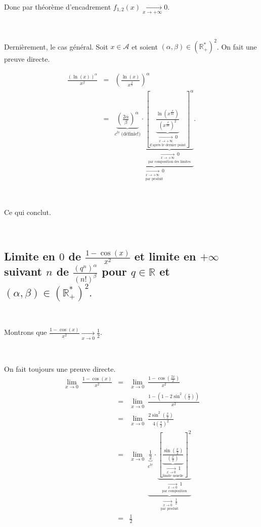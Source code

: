 \documentclass{article}
\begin{document}
\

Donc par théorème d'encadrement $f_{1,2}(x)\xrightarrow[x\to+\infty]{} 0$.

\

Dernièrement, le cas général. Soit $x\in \mathcal{A}$ et soient $(\alpha,\beta)\in \left( \mathbb{R}_+^* \right)^2$. On fait une preuve directe. 

\begin{eqnarray*}
    \frac{(\ln (x))^\alpha}{x^\beta} & = & \left( \frac{\ln (x)}{x^{\frac{\beta}{\alpha}}} \right)^\alpha \\[1.5ex]
    & = & \underset{\underset{\text{par produit}}{\xrightarrow[x\to+\infty]{} \ 0}}{\underbrace{\underset{c^{\underline{te}} \ \text{(définie!)}}{\underbrace{\left( \frac{2\alpha}{\beta} \right)^\alpha}} \cdot \underset{\underset{\text{par composition des limites}}{\xrightarrow[x\to+\infty]{} \ 0}}{\underbrace{\left[ \underset{\underset{\text{d'après le dernier point}}{\xrightarrow[x\to+\infty]{} \ 0}}{\underbrace{ \frac{\ln \left( x^{\frac{\beta}{2 \alpha}} \right) }{\left( x^{\frac{\beta}{2\alpha}} \right)^2} }}\right]^\alpha}}}}.
\end{eqnarray*}

\

Ce qui conclut.

\


\subsection{Limite en $0$ de $\frac{1-\cos (x)}{x^2}$ et limite en $+\infty$ suivant $n$ de $\frac{\left(q^n \right)^\alpha}{(n!)^\beta}$ pour $q\in \mathbb{R}$ et $(\alpha,\beta)\in \left( \mathbb{R}_+^* \right)^2.$} 

\

Montrons que $\frac{1-\cos (x)}{x^2} \xrightarrow[x\to 0]{} \frac{1}{2}$.

\

On fait toujours une preuve directe. 
\begin{eqnarray*}
    \lim_{x\to0} \ \frac{1-\cos (x)}{x^2} & = & \lim_{x\to0} \ \frac{1-\cos \left( \frac{2x}{2}\right) }{x^2} \\[1ex]
    & = & \lim_{x\to0} \ \frac{1-\left( 1-2\sin ^2 \left( \frac{x}{2}\right) \right) }{x^2} \\[1ex]
    & = &  \lim_{x\to0} \ \frac{2\sin ^2 \left( \frac{x}{2}\right) }{4 \left( \frac{x}{2}\right) ^2} \\[1ex]
    & = & \lim_{x\to0} \ \underset{\underset{\text{par produit}}{\xrightarrow[x\to 0]{} \ \frac{1}{2}}}{\underbrace{\underset{c^{\underline{te}}}{\underbrace{\frac{1}{2}}} \cdot \underset{\underset{\text{par composition}}{\xrightarrow[x\to 0]{} \ 1}}{\underbrace{\left[\underset{\underset{\text{limite usuelle}}{\xrightarrow[x\to 0]{} \ 1}}{\underbrace{\frac{\sin \left( \frac{x}{2}\right) }{\left( \frac{x}{2}\right)} }} \right] ^2}}}} \\[1ex]
    & = & \frac{1}{2}
\end{eqnarray*}
\end{document}
